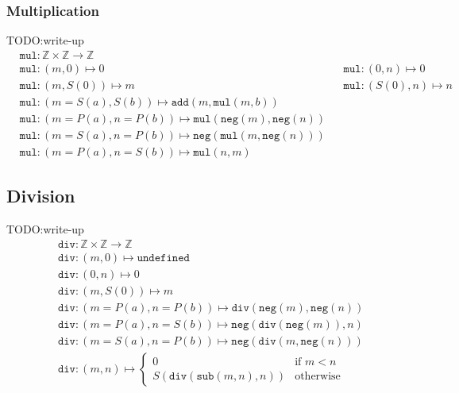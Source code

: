 \documentclass{article}
\newcommand{\Z}{\mathbb{Z}}
\newcommand{\ttneg}{\mathtt{neg}}
\newcommand{\ttadd}{\mathtt{add}}
\newcommand{\ttsub}{\mathtt{sub}}
\newcommand{\ttmul}{\mathtt{mul}}
\newcommand{\ttdiv}{\mathtt{div}}
\begin{document}
\subsubsection*{Multiplication}
TODO:\@{}write-up
\begin{align*}
&{} \ttmul : \Z \times \Z \to \Z \\
&{} \ttmul : (m, 0) \mapsto 0 &
&{} \ttmul : (0, n) \mapsto 0 \\
&{} \ttmul : (m, S(0)) \mapsto m &
&{} \ttmul : (S(0), n) \mapsto n \\
&{} \ttmul : (m=S(a), S(b)) \mapsto \ttadd(m, \ttmul(m, b)) \\
&{} \ttmul : (m=P(a), n=P(b)) \mapsto \ttmul(\ttneg(m), \ttneg(n)) \\
&{} \ttmul : (m=S(a), n=P(b)) \mapsto \ttneg(\ttmul(m, \ttneg(n))) \\
&{} \ttmul : (m=P(a), n=S(b)) \mapsto \ttmul(n, m)
\end{align*}

\subsection*{Division}
TODO:\@{}write-up
\begin{align*}
&{} \ttdiv : \Z \times \Z \to \Z \\
&{} \ttdiv : (m, 0) \mapsto \mathtt{undefined} \\
&{} \ttdiv : (0, n) \mapsto 0 \\
&{} \ttdiv : (m, S(0)) \mapsto m \\
&{} \ttdiv : (m=P(a), n=P(b)) \mapsto \ttdiv(\ttneg(m), \ttneg(n)) \\
&{} \ttdiv : (m=P(a), n=S(b)) \mapsto \ttneg(\ttdiv(\ttneg(m)), n) \\
&{} \ttdiv : (m=S(a), n=P(b)) \mapsto \ttneg(\ttdiv(m, \ttneg(n))) \\
&{} \ttdiv : (m, n) \mapsto \begin{cases}
0 & \text{if } m < n \\
S(\ttdiv(\ttsub(m, n), n)) & \text{otherwise}
\end{cases}
\end{align*}
\end{document}
